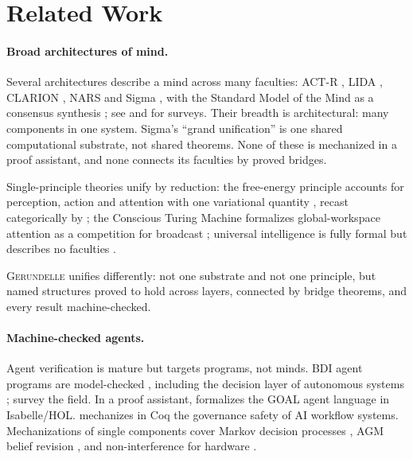 \documentclass[11pt]{article}
\newcommand{\gerundelle}{\textsc{Gerundelle}}
\theoremstyle{remark}
\begin{document}
\section{Related Work}
\label{sec:related}

\paragraph{Broad architectures of mind.}

Several architectures describe a mind across many faculties: ACT-R
\citep{Anderson2004}, LIDA \citep{Franklin2014}, CLARION \citep{Sun2016}, NARS
\citep{Wang2013} and Sigma \citep{RosenbloomDemskiUstun2016}, with the Standard Model of
the Mind as a consensus synthesis \citep{LairdLebiereRosenbloom2017}; see
\citet{LangleyLairdRogers2009} and \citet{KotserubaTsotsos2020} for surveys. Their breadth
is architectural: many components in one system. Sigma's ``grand unification'' is one shared
computational substrate, not shared theorems. None of these is mechanized in a proof
assistant, and none connects its faculties by proved bridges.

Single-principle theories unify by reduction: the free-energy principle accounts for
perception, action and attention with one variational quantity \citep{Friston2010}, recast
categorically by \citet{Smithe2022}; the Conscious Turing Machine formalizes
global-workspace attention as a competition for broadcast \citep{BlumBlum2022}; universal
intelligence is fully formal but describes no faculties \citep{LeggHutter2007}.

\gerundelle{} unifies differently: not one substrate and not one principle, but named
structures proved to hold across layers, connected by bridge theorems, and every result
machine-checked.

\paragraph{Machine-checked agents.}

Agent verification is mature but targets programs, not minds. BDI agent programs are
model-checked \citep{Bordini2006,Dennis2012,Dennis2018}, including the decision layer of
autonomous systems \citep{Dennis2016}; \citet{Luckcuck2019} survey the field. In a proof
assistant, \citet{Jensen2021,Jensen2022} formalizes the GOAL agent language in Isabelle/HOL.
\citet{McCann2026} mechanizes in Coq the governance safety of AI workflow systems.
Mechanizations of single components cover Markov decision processes
\citep{Vajjha2021,SchaefflerAbdulaziz2023}, AGM belief revision \citep{Fouillard2021},
and non-interference for hardware \citep{AzevedodeAmorim2016}.
\end{document}
